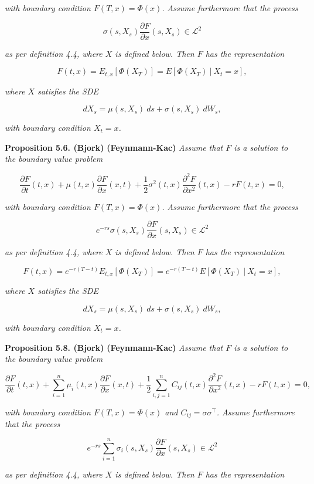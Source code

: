 \documentclass[a4paper,12pt,openany]{book}
\begin{document}
\emph{with boundary condition \(F(T,x)=\Phi(x)\). Assume furthermore that the process}

\[
\sigma(s,X_s)\frac{\partial F}{\partial x}(s,X_s) \in \mathcal{L}^2
\]

\emph{as per definition 4.4, where \(X\) is defined below. Then \(F\) has the representation}

\[
F(t,x)=E_{t,x}[\Phi(X_T)]=E[\Phi(X_T)\ \vert\ X_t=x],\tag{5.29}
\]

\emph{where \(X\) satisfies the SDE}

\[
dX_s=\mu(s,X_s)\ ds+\sigma(s,X_s)\ dW_s,\tag{5.30}
\]

\emph{with boundary condition \(X_t=x\).}

\textbf{Proposition 5.6. (Bjork)} \textbf{(Feynmann-Kac)} \emph{Assume that \(F\) is a solution to the boundary value problem}

\[
\frac{\partial F}{\partial t}(t,x)+\mu(t,x)\frac{\partial F}{\partial x}(x,t)+\frac{1}{2}\sigma^2(t,x)\frac{\partial^2 F}{\partial x^2}(t,x)-rF(t,x)=0,\tag{5.34}
\]

\emph{with boundary condition \(F(T,x)=\Phi(x)\). Assume furthermore that the process}

\[
e^{-rs}\sigma(s,X_s)\frac{\partial F}{\partial x}(s,X_s) \in \mathcal{L}^2
\]

\emph{as per definition 4.4, where \(X\) is defined below. Then \(F\) has the representation}

\[
F(t,x)=e^{-r(T-t)}E_{t,x}[\Phi(X_T)]=e^{-r(T-t)}E[\Phi(X_T)\ \vert\ X_t=x],\tag{5.36}
\]

\emph{where \(X\) satisfies the SDE}

\[
dX_s=\mu(s,X_s)\ ds+\sigma(s,X_s)\ dW_s,\tag{5.37}
\]

\emph{with boundary condition \(X_t=x\).}

\textbf{Proposition 5.8. (Bjork)} \textbf{(Feynmann-Kac)} \emph{Assume that \(F\) is a solution to the boundary value problem}

\[
\frac{\partial F}{\partial t}(t,x)+\sum_{i=1}^n\mu_i(t,x)\frac{\partial F}{\partial x}(x,t)+\frac{1}{2}\sum_{i,j=1}^n C_{ij}(t,x)\frac{\partial^2 F}{\partial x^2}(t,x)-rF(t,x)=0,
\]

\emph{with boundary condition \(F(T,x)=\Phi(x)\) and \(C_{ij}=\sigma \sigma^\top\). Assume furthermore that the process}

\[
e^{-rs}\sum_{i=1}^n\sigma_i(s,X_s)\frac{\partial F}{\partial x}(s,X_s) \in \mathcal{L}^2
\]

\emph{as per definition 4.4, where \(X\) is defined below. Then \(F\) has the representation}
\end{document}
